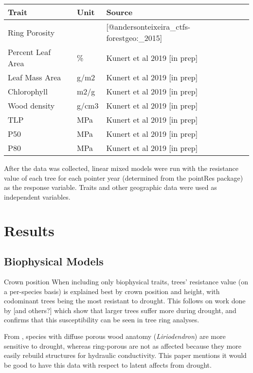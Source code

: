 \documentclass[]{book}
\begin{document}
\begin{table}[H]
\centering
\begin{tabular}{l|l|l}
\hline
Trait & Unit & Source\\
\hline
Ring Porosity &  & [@andersonteixeira\_ctfs-forestgeo:\_2015]\\
\hline
Percent Leaf Area & \% & Kunert et al 2019 [in prep]\\
\hline
Leaf Mass Area & g/m2 & Kunert et al 2019 [in prep]\\
\hline
Chlorophyll & m2/g & Kunert et al 2019 [in prep]\\
\hline
Wood density & g/cm3 & Kunert et al 2019 [in prep]\\
\hline
TLP & MPa & Kunert et al 2019 [in prep]\\
\hline
P50 & MPa & Kunert et al 2019 [in prep]\\
\hline
P80 & MPa & Kunert et al 2019 [in prep]\\
\hline
\end{tabular}
\end{table}

After the data was collected, linear mixed models were run with the resistance value of each tree for each pointer year (determined from the pointRes package) as the response variable. Traits and other geographic data were used as independent variables.

\hypertarget{results}{%
\chapter{Results}\label{results}}

\hypertarget{biophysical-models}{%
\section{Biophysical Models}\label{biophysical-models}}

Crown position
When including only biophysical traits, trees' resistance value (on a per-species basis) is explained best by crown position and height, with codominant trees being the most resistant to drought. This follows on work done by \citep{bennett_larger_2015} {[}and others?{]} which show that larger trees suffer more during drought, and confirms that this susceptibility can be seen in tree ring analyses.

From \citep{kannenberg_linking_2019}, species with diffuse porous wood anatomy (\emph{Liriodendron}) are more sensitive to drought, whereas ring-porous are not as affected because they more easily rebuild structures for hydraulic conductivity. This paper mentions it would be good to have this data with respect to latent affects from drought.
\end{document}
